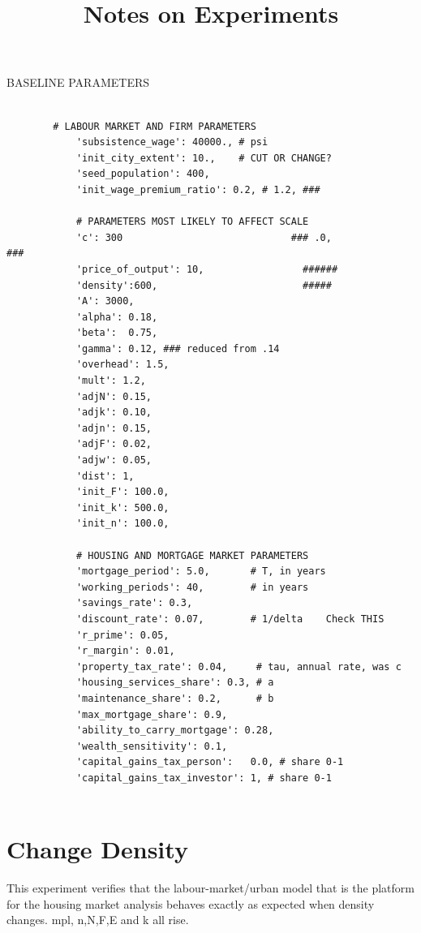 \documentclass{article}
\title{Notes on Experiments}
\begin{document}
\maketitle
\tableofcontents \newpage
BASELINE PARAMETERS
\begin{verbatim}

        # LABOUR MARKET AND FIRM PARAMETERS
            'subsistence_wage': 40000., # psi
            'init_city_extent': 10.,    # CUT OR CHANGE?
            'seed_population': 400,
            'init_wage_premium_ratio': 0.2, # 1.2, ###

            # PARAMETERS MOST LIKELY TO AFFECT SCALE
            'c': 300                             ### .0,                            ###
            'price_of_output': 10,                 ######
            'density':600,                         #####
            'A': 3000,
            'alpha': 0.18,
            'beta':  0.75,
            'gamma': 0.12, ### reduced from .14
            'overhead': 1.5,
            'mult': 1.2,
            'adjN': 0.15,
            'adjk': 0.10,
            'adjn': 0.15,
            'adjF': 0.02,
            'adjw': 0.05, 
            'dist': 1, 
            'init_F': 100.0,
            'init_k': 500.0,
            'init_n': 100.0,

            # HOUSING AND MORTGAGE MARKET PARAMETERS
            'mortgage_period': 5.0,       # T, in years
            'working_periods': 40,        # in years
            'savings_rate': 0.3,
            'discount_rate': 0.07,        # 1/delta    Check THIS
            'r_prime': 0.05,
            'r_margin': 0.01,
            'property_tax_rate': 0.04,     # tau, annual rate, was c
            'housing_services_share': 0.3, # a
            'maintenance_share': 0.2,      # b
            'max_mortgage_share': 0.9,
            'ability_to_carry_mortgage': 0.28,
            'wealth_sensitivity': 0.1,
            'capital_gains_tax_person':   0.0, # share 0-1
            'capital_gains_tax_investor': 1, # share 0-1
    
\end{verbatim}
\newpage


 \section{Change Density}
 This experiment verifies that the labour-market/urban model that is the platform for the housing market analysis behaves exactly as expected when density changes. mpl, n,N,F,E and k all rise.
 
\end{document}
